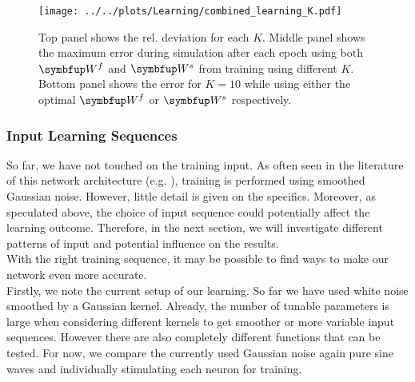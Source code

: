 \begin{figure}
	\centering
	\texttt{[image: ../../plots/Learning/combined\_learning\_K.pdf]}
	\caption{Top panel shows the rel. deviation for each $K$. Middle panel shows the maximum error during simulation after each epoch using both $\bmu{W}^f$ and $\bmu{W}^s$ from training using different $K$. Bottom panel shows the error for $K = 10$ while using either the optimal $\bmu{W}^f$ or $\bmu{W}^s$ respectively.}
	\label{fig:combined_learning_K}
\end{figure}

\subsubsection{Input Learning Sequences}
So far, we have not touched on the training input. As often seen in the literature of this network architecture (e.g. \cite{brendel_learning_2020,alemi_learning_2017,vertechi_unsupervised_2014,bourdoukan_enforcing_2015}), training is performed using smoothed Gaussian noise. However, little detail is given on the specifics. Moreover, as speculated above, the choice of input sequence could potentially affect the learning outcome. Therefore, in the next section, we will investigate different patterns of input and potential influence on the results.\\
With the right training sequence, it may be possible to find ways to make our network even more accurate.\\
Firstly, we note the current setup of our learning. So far we have used white noise smoothed by a Gaussian kernel. Already, the number of tunable parameters is large when considering different kernels to get smoother or more variable input sequences. However there are also completely different functions that can be tested. For now, we compare the currently used Gaussian noise again pure sine waves and individually stimulating each neuron for training.
